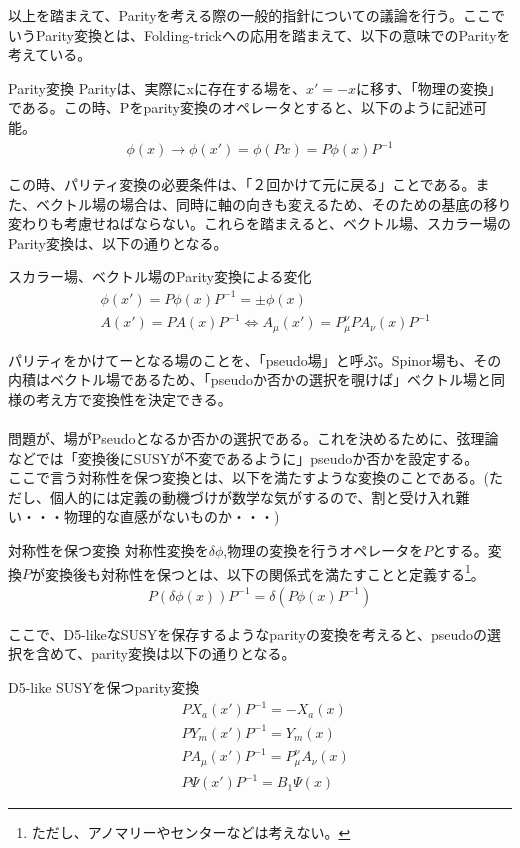 \documentclass[dvipdfmx,a4paper,10.5pt]{article}
\numberwithin{equation}{section}
\begin{document}
以上を踏まえて、Parityを考える際の一般的指針についての議論を行う。ここでいうParity変換とは、Folding-trickへの応用を踏まえて、以下の意味でのParityを考えている。
\begin{defbox}{Parity変換}
    Parityは、実際にxに存在する場を、$x'=-x$に移す、「物理の変換」である。この時、Pをparity変換のオペレータとすると、以下のように記述可能。
    \begin{align*}
        \phi(x)\to \phi(x')=\phi(Px)=P\phi(x)P^{-1}
    \end{align*}
\end{defbox}
この時、パリティ変換の必要条件は、「２回かけて元に戻る」ことである。また、ベクトル場の場合は、同時に軸の向きも変えるため、そのための基底の移り変わりも考慮せねばならない。これらを踏まえると、ベクトル場、スカラー場のParity変換は、以下の通りとなる。
\begin{resultbox}{スカラー場、ベクトル場のParity変換による変化}
    \begin{align*}
        &\phi(x')=P\phi(x)P^{-1}=\pm\phi(x)\\
        &A(x')=PA(x)P^{-1}\iff A_{\mu}(x')=P_{\mu}^{\nu}PA_{\nu}(x)P^{-1} 
    \end{align*}
\end{resultbox}
パリティをかけてーとなる場のことを、「pseudo場」と呼ぶ。Spinor場も、その内積はベクトル場であるため、「pseudoか否かの選択を覗けば」ベクトル場と同様の考え方で変換性を決定できる。\\
\\
問題が、場がPseudoとなるか否かの選択である。これを決めるために、弦理論などでは「変換後にSUSYが不変であるように」pseudoか否かを設定する。\\
ここで言う対称性を保つ変換とは、以下を満たすような変換のことである。(ただし、個人的には定義の動機づけが数学な気がするので、割と受け入れ難い・・・物理的な直感がないものか・・・)
\begin{defbox}{対称性を保つ変換}
    対称性変換を$\delta\phi$,物理の変換を行うオペレータを$P$とする。変換$P$が変換後も対称性を保つとは、以下の関係式を満たすことと定義する\footnote{ただし、アノマリーやセンターなどは考えない。}。
    \begin{align*}
        P(\delta \phi(x))P^{-1}=\delta(P\phi(x)P^{-1})
    \end{align*}
\end{defbox}
ここで、D5-likeなSUSYを保存するようなparityの変換を考えると、pseudoの選択を含めて、parity変換は以下の通りとなる。
\begin{resultbox}{D5-like SUSYを保つparity変換}
    \begin{align*}
        &PX_{a}(x')P^{-1}=-X_{a}(x)\\
        &PY_{m}(x')P^{-1}=Y_{m}(x)\\
        &PA_{\mu}(x')P^{-1}=P_{\mu}^{\nu}A_{\nu}(x)\\
        &P\Psi(x')P^{-1}=B_{1}\Psi(x)
    \end{align*}
\end{resultbox}
\end{document}
